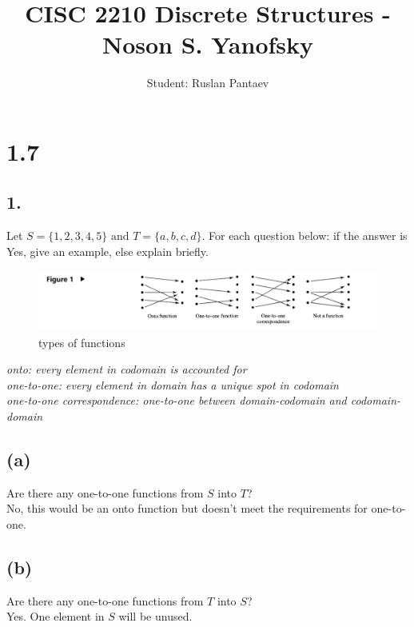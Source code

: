 \documentclass[11pt]{article}
\begin{document}
\title{CISC 2210 Discrete Structures - Noson S. Yanofsky}
\author{Student: Ruslan Pantaev}
\maketitle

\section*{1.7}
%
%
\subsection*{1.}
\begin{center}
Let $S = \{1,2,3,4,5\} \text{ and } T = \{a,b,c,d\}$. For each question below: if the answer is Yes, give an example, else explain briefly.\\
\begin{figure}[h!]
	\includegraphics[width=\linewidth]{figure1_types_of_functions.png}
	\caption{types of functions}
	\label{fig:figure1}
\end{figure}
\textit{onto: every element in codomain is accounted for}\\
\textit{one-to-one: every element in domain has a unique spot in codomain}\\
\textit{one-to-one correspondence: one-to-one between domain-codomain and codomain-domain}
\end{center}

\subsection*{(a)}
\begin{center}
Are there any one-to-one functions from $S$ into $T$?\\
\hfill \break
No, this would be an onto function but doesn't meet the requirements for one-to-one.
\end{center}

\subsection*{(b)}
\begin{center}
Are there any one-to-one functions from $T$ into $S$?\\
\hfill \break
Yes. One element in $S$ will be unused.
\end{center}
\end{document}
